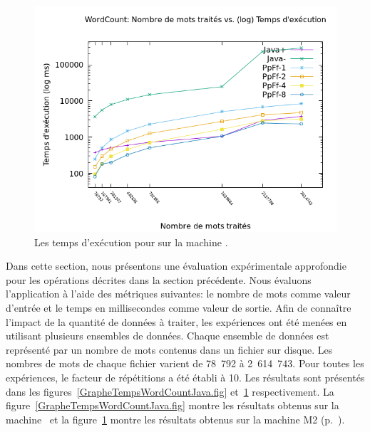 \begin{figure}[H]
\centering
     \includegraphics[width=1.0\textwidth]{Figures/graphe_temps_Japet_WordCount.png}
      \caption{Les temps d'ex\'ecution pour  sur la machine .}
       \label{GrapheTempsWordCountJapet.fig}
\end{figure}



Dans cette section, nous présentons une \'evaluation exp\'erimentale approfondie pour les op\'erations d\'ecrites dans la section pr\'ec\'edente. Nous \'evaluons l'application  \`a l'aide des m\'etriques suivantes: le nombre de mots comme valeur d'entr\'ee et le temps en millisecondes comme valeur de sortie. Afin de conna\^itre l'impact de la quantit\'e de donn\'ees \`a traiter, les exp\'eriences ont \'et\'e men\'ees en utilisant plusieurs ensembles de donn\'ees. Chaque ensemble de donn\'ees est repr\'esent\'e par un nombre de mots contenus dans un fichier sur disque. Les nombres de mots de chaque fichier varient de 78~792 \`a 2~614~743. Pour toutes les exp\'eriences, le facteur de r\'ep\'etitions a \'et\'e \'etabli \`a 10.  Les r\'esultats sont pr\'esent\'es dans les figures~\ref{GrapheTempsWordCountJava.fig} et~\ref{GrapheTempsWordCountJapet.fig} respectivement. La figure~\ref{GrapheTempsWordCountJava.fig} montre les résultats obtenus sur la machine \ et la figure~\ref{GrapheTempsWordCountJapet.fig} montre les r\'esultats obtenus sur la machine M2 (p.~\pageref{machines.sect}).

